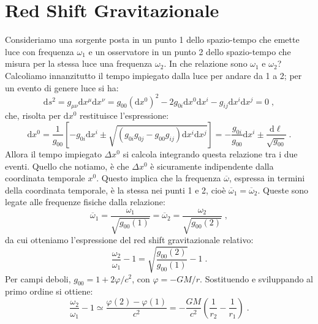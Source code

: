 \documentclass[12pt,a4paper]{report}
\theoremstyle{definition}
\newcommand{\diff}[1][]{\mathrm{d}#1}
\begin{document}
\section{Red Shift Gravitazionale}
Consideriamo una sorgente posta in un punto 1 dello spazio-tempo che emette luce con frequenza $\omega_1$ e un osservatore in un punto 2 dello spazio-tempo che misura per la stessa luce una frequenza $\omega_2$. In che relazione sono $\omega_1$ e $\omega_2$? Calcoliamo innanzitutto il tempo impiegato dalla luce per andare da 1 a 2; per un evento di genere luce si ha:
$$
\diff{s^2}=g_{\mu\nu}\diff{x^{\mu}}\diff{x^{\nu}}=g_{00}(\diff{x^0})^2-2g_{0i}\diff{x^0}\diff{x^i}-g_{ij}\diff{x^i}\diff{x^j}=0\;,
$$
che, risolta per $\diff{x^0}$ restituisce l'espressione:
\begin{equation}
\diff{x^0}=\frac{1}{g_{00}}\left[-g_{0i}\diff{x^i}\pm \sqrt{(g_{0i}g_{0j}-g_{00}g_{ij})\diff{x^i}\diff{x^j}}\right]=-\frac{g_{0i}}{g_{00}}\diff{x^i}\pm\frac{\diff{\ell}}{\sqrt{g_{00}}}\;.
\end{equation}
Allora il tempo impiegato $\Delta x^0$ si calcola integrando questa relazione tra i due eventi. Quello che notiamo, è che $\Delta x^0$ è sicuramente indipendente dalla coordinata temporale $x^0$. Questo implica che la frequenza $\overline{\omega}$, espressa in termini della coordinata temporale, è la stessa nei punti 1 e 2, cioè $\overline{\omega}_1=\overline{\omega}_2$. Queste sono legate alle frequenze fisiche dalla relazione:
$$
\overline{\omega}_1=\frac{\omega_1}{\sqrt{g_{00}(1)}}=\overline{\omega}_2=\frac{\omega_2}{\sqrt{g_{00}(2)}}\;,
$$
da cui otteniamo l'espressione del red shift gravitazionale relativo:
\begin{equation}
\frac{\omega_2}{\omega_1}-1=\sqrt{\frac{g_{00}(2)}{g_{00}(1)}}-1\;.
\end{equation}
Per campi deboli, $g_{00}=1+2\varphi/c^2$, con $\varphi=-GM/r$. Sostituendo e sviluppando al primo ordine si ottiene:
\begin{equation}
\frac{\omega_2}{\omega_1}-1\simeq \frac{\varphi(2)-\varphi(1)}{c^2}=-\frac{GM}{c^2}\left(\frac{1}{r_2}-\frac{1}{r_1}\right)\;.
\end{equation}
\end{document}
